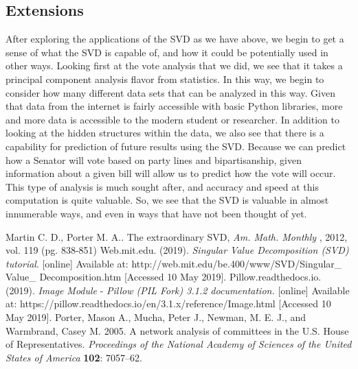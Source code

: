 \documentclass[letterpaper,12pt]{article}
\begin{document}
\subsection{Extensions}
After exploring the applications of the SVD as we have above, we begin to get a sense of what the SVD is capable of, and how it could be potentially used in other ways. Looking first at the vote analysis that we did, we see that it takes a principal component analysis flavor from statistics. In this way, we begin to consider how many different data sets that can be analyzed in this way. Given that data from the internet is fairly accessible with basic Python libraries, more and more data is accessible to the modern student or researcher. In addition to looking at the hidden structures within the data, we also see that there is a capability for prediction of future results using the SVD. Because we can predict how a Senator will vote based on party lines and bipartisanship, given information about a given bill will allow us to predict how the vote will occur. This type of analysis is much sought after, and accuracy and speed at this computation is quite valuable. So, we see that the SVD is valuable in almost innumerable ways, and even in ways that have not been thought of yet.
\newpage
\begin{thebibliography}{9}
Martin C. D.,  Porter M. A.. The extraordinary SVD, \textit{Am. Math. Monthly} , 2012, vol. 119 (pg. 838-851)
Web.mit.edu. (2019). \textit{Singular Value Decomposition (SVD) tutorial}. [online] Available at: http://web.mit.edu/be.400/www/SVD/Singular\_ Value\_ Decomposition.htm [Accessed 10 May 2019].
Pillow.readthedocs.io. (2019). \textit{Image Module} - \textit{Pillow (PIL Fork) 3.1.2 documentation.} [online] Available at: https://pillow.readthedocs.io/en/3.1.x/reference/Image.html [Accessed 10 May 2019].
Porter, Mason A., Mucha, Peter J., Newman, M. E. J., and Warmbrand, Casey M. 2005. A network analysis of committees in the U.S. House of Representatives. \textit{Proceedings of the National Academy of Sciences of the United States of America} \textbf{102}: 7057–62.
\end{thebibliography}
\end{document}
